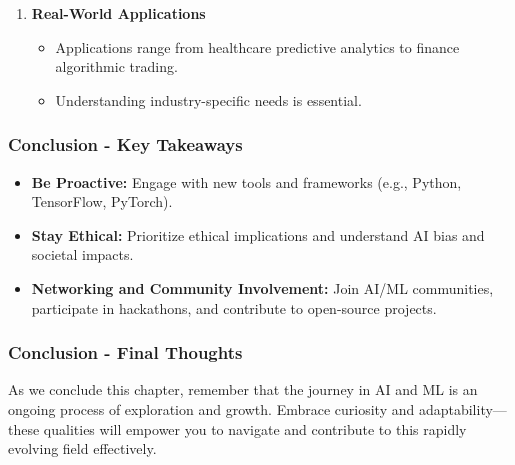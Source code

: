 \documentclass[aspectratio=169]{beamer}
\begin{document}
\begin{frame}[fragile]
\begin{enumerate}
        \item \textbf{Real-World Applications}
        \begin{itemize}
            \item Applications range from healthcare predictive analytics to finance algorithmic trading.
            \item Understanding industry-specific needs is essential.
        \end{itemize}
    \end{enumerate}
\end{frame}

\begin{frame}[fragile]
    \frametitle{Conclusion - Key Takeaways}
    \begin{itemize}
        \item \textbf{Be Proactive:} Engage with new tools and frameworks (e.g., Python, TensorFlow, PyTorch).
        \item \textbf{Stay Ethical:} Prioritize ethical implications and understand AI bias and societal impacts.
        \item \textbf{Networking and Community Involvement:} Join AI/ML communities, participate in hackathons, and contribute to open-source projects.
    \end{itemize}
\end{frame}

\begin{frame}[fragile]
    \frametitle{Conclusion - Final Thoughts}
    As we conclude this chapter, remember that the journey in AI and ML is an ongoing process of exploration and growth. Embrace curiosity and adaptability—these qualities will empower you to navigate and contribute to this rapidly evolving field effectively.
\end{frame}
\end{document}
